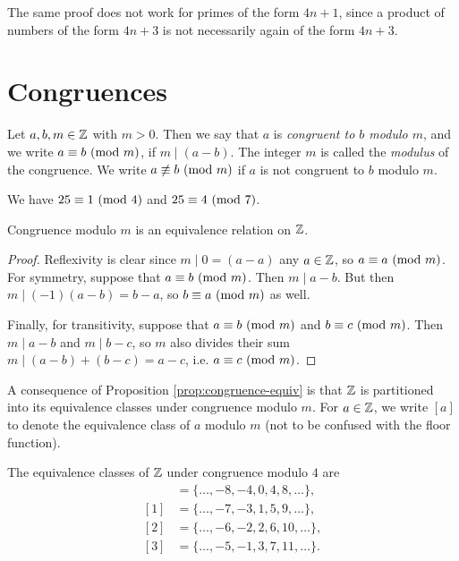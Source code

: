 \begin{remark}
  The same proof does not work for
  primes of the form $4n + 1$, since a
  product of numbers of the form
  $4n + 3$ is not necessarily again
  of the form $4n + 3$.
\end{remark}

\section{Congruences}

\begin{definition}
  Let $a, b, m \in \mathbb{Z}$ with $m > 0$.
  Then we say that $a$ is \emph{congruent
  to $b$ modulo $m$}, and we write
  $a \equiv b \ (\mathrm{mod}\ m)$,
  if $m \mid (a - b)$. The integer
  $m$ is called the \emph{modulus}
  of the congruence. We write
  $a \not\equiv b \ (\mathrm{mod}\ m)$ if
  $a$ is not congruent to $b$ modulo $m$.
\end{definition}

\begin{example}
  We have $25 \equiv 1 \ (\mathrm{mod}\ 4)$ and
  $25 \equiv 4 \ (\mathrm{mod}\ 7)$.
\end{example}

\begin{prop}\label{prop:congruence-equiv}
  Congruence modulo $m$ is
  an equivalence relation on $\mathbb{Z}$.
\end{prop}

\begin{proof}
  Reflexivity is clear since
  $m \mid 0 = (a - a)$ any $a \in \mathbb{Z}$,
  so $a \equiv a \ (\mathrm{mod}\ m)$.
  For symmetry, suppose that
  $a \equiv b \ (\mathrm{mod}\ m)$. Then
  $m \mid a - b$. But then $m \mid (-1)(a - b) = b - a$, so
  $b \equiv a \ (\mathrm{mod}\ m)$ as well.

  Finally, for transitivity, suppose that
  $a \equiv b \ (\mathrm{mod}\ m)$ and
  $b \equiv c \ (\mathrm{mod}\ m)$. Then
  $m \mid a - b$ and $m \mid b - c$, so
  $m$ also divides their sum
  $m \mid (a - b) + (b - c) = a - c$, i.e.
  $a \equiv c \ (\mathrm{mod}\ m)$.
\end{proof}

\begin{remark}
  A consequence of Proposition
  \ref{prop:congruence-equiv}
  is that $\mathbb{Z}$ is partitioned into
  its equivalence classes under congruence
  modulo $m$. For $a \in \mathbb{Z}$, we
  write $[a]$ to denote the equivalence
  class of $a$ modulo $m$ (not to be
  confused with the floor function).
\end{remark}

\begin{example}
  The equivalence classes of $\mathbb{Z}$
  under congruence modulo $4$ are
  \begin{align*}
    [0]
    &= \{\dots, -8, -4, 0, 4, 8, \dots\}, \\
    [1]
    &= \{\dots, -7, -3, 1, 5, 9, \dots\}, \\
    [2]
    &= \{\dots, -6, -2, 2, 6, 10, \dots\}, \\
    [3]
    &= \{\dots, -5, -1, 3, 7, 11, \dots\}.
  \end{align*}
\end{example}

